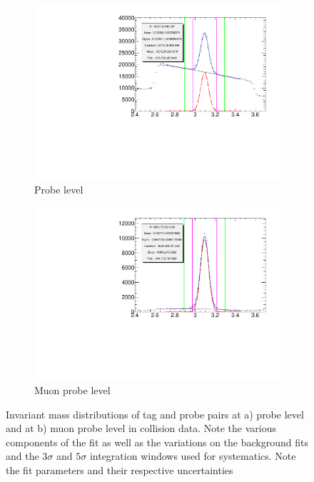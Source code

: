 \begin{figure}[thbp]
  \centering
  \begin{subfigure}[b]{0.85\textwidth}
  \includegraphics[width=\textwidth]{PartCalibration2012/Plots/Kinematics/Data_InvMass_pt_5_6_barrel_probe.pdf}
    \caption{Probe level}
  \end{subfigure}

  \begin{subfigure}[b]{0.85\textwidth}
    \includegraphics[width=\textwidth]{PartCalibration2012/Plots/Kinematics/Data_InvMass_pt_5_6_barrel_muonprobe.pdf}
    \caption{Muon probe level}   
  \end{subfigure} 
  \caption{Invariant mass distributions of tag and probe pairs at a) probe level and at b) muon probe level in collision data. Note the various components of the fit as well as the variations on the background fits and the $3\sigma$ and $5\sigma$ integration windows used for systematics. Note the fit parameters and their respective uncertainties} \label{fig:CalibrationFittingResult}
\end{figure}

